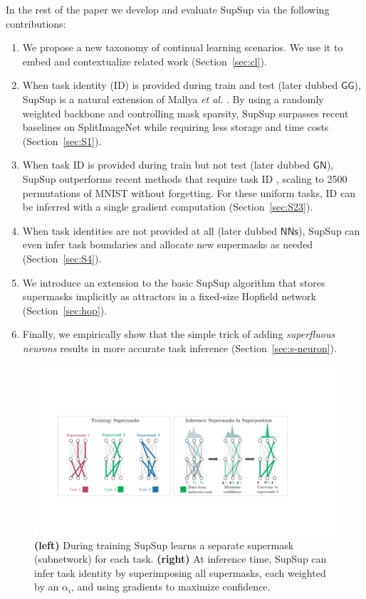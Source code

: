 \documentclass{article}
\newcommand{\ac}{SupSup\xspace}
\newcommand{\casename}[1]{\ensuremath{\mathsf{#1}}\xspace}
\newcommand{\figlabel}[1]{\label{fig:#1}}
\newcommand{\secref}[1]{Section~\ref{sec:#1}}
\begin{document}
In the rest of the paper we develop and evaluate \ac via the following contributions:
\begin{enumerate}
    \item We propose a new taxonomy of continual learning scenarios. We use it to embed and contextualize related work (\secref{cl}).
    \item When task identity (ID) is provided during train and test (later dubbed \casename{GG}), \ac is a natural extension of Mallya \textit{et al.} \cite{mallya2018piggyback}. By using a randomly weighted backbone and controlling mask sparsity, \ac surpasses recent baselines on SplitImageNet \cite{wen2020batchensemble} while requiring less storage and time costs (\secref{S1}).
    \item When task ID is provided during train but not test (later dubbed \casename{GN}), \ac outperforms recent methods that require task ID \cite{mnist, kirkpatrick2017overcoming, cheung2019superposition}, scaling to 2500 permutations of MNIST without forgetting. For these uniform tasks, ID can be inferred with a single gradient computation (\secref{S23}). 
    \item When task identities are not provided at all (later dubbed \casename{NNs}), \ac can even infer task boundaries and allocate new supermasks as needed (\secref{S4}).
    \item We introduce an extension to the basic \ac algorithm that stores supermasks implicitly as attractors in a fixed-size Hopfield network \cite{hopfield1982neural} (\secref{hop}).    
    \item Finally, we empirically show that the simple trick of adding \emph{superfluous neurons} results in more accurate task inference (\secref{s-neuron}).
\end{enumerate}

\begin{figure}[t]
    \centering
    \includegraphics[width=\textwidth]{figs/teaser_ppt.pdf}
    \caption{\textbf{(left)} During training \ac learns a separate supermask (subnetwork) for each task. \textbf{(right)} At inference time, \ac can infer task identity by superimposing all supermasks, each weighted by an $\alpha_i$, and using gradients to maximize confidence.}
    \vspace*{-2ex}
    \figlabel{teaser}
\end{figure}
\end{document}
